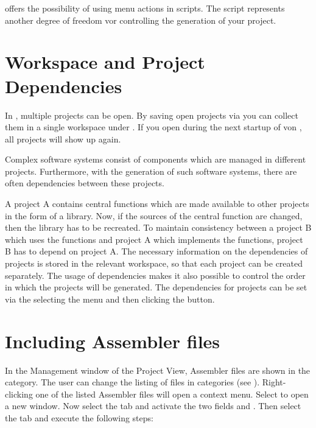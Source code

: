 \codeblocks offers the possibility of using menu actions in scripts. The script represents another degree of freedom vor controlling the generation of your project.


\section{Workspace and Project Dependencies}

In \codeblocks, multiple projects can be open. By saving open projects via  you can collect them in a single workspace under . If you open  during the next startup of von \codeblocks, all projects will show up again.

Complex software systems consist of components which are managed in different \codeblocks projects. Furthermore, with the generation of such software systems, there are often dependencies between these projects.


A project A contains central functions which are made available to other projects in the form of a library. Now, if the sources of the central function are changed, then the library has to be recreated. To maintain consistency between a project B which uses the functions and project A which implements the functions, project B has to depend on project A. The necessary information on the dependencies of projects is stored in the relevant workspace, so that each project can be created separately. The usage of dependencies makes it also possible to control the order in which the projects will be generated. The dependencies for projects can be set via the selecting the menu  and then clicking the  button.

\section{Including Assembler files}

In the Management window of the Project View, Assembler files are shown in the  category. The user can change the listing of files in categories (see ). Right-clicking one of the listed Assembler files will open a context menu. Select  to open a new window. Now select the  tab and activate the two fields  and . Then select the  tab and execute the following steps:


